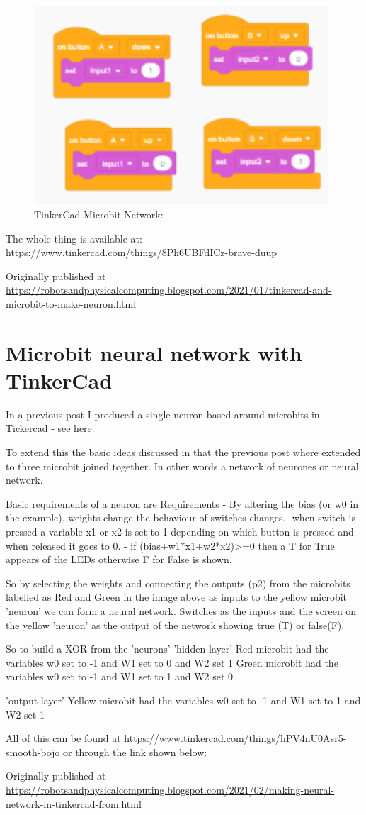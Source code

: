 \begin{figure}
    \centering
    \includegraphics[width=11cm]{chapters/chAi1/figures/Tinkercadann4.png}
    \caption{TinkerCad Microbit Network: }
    \label{fig:tinkercad_neural_microbit_network_basic3}
\end{figure}

The whole thing is available at: \url{https://www.tinkercad.com/things/8Ph6UBFdICz-brave-duup }

Originally published at \url{https://robotsandphysicalcomputing.blogspot.com/2021/01/tinkercad-and-microbit-to-make-neuron.html}


\section{Microbit neural network with TinkerCad}
In a previous post I produced a single neuron based around microbits in Tickercad - see here.

To extend this the basic ideas discussed in that the previous post where extended to three microbit joined together. In  other words a network of neurones or neural network.

Basic requirements of a neuron are
Requirements 
- By altering the bias (or w0 in the example), weights change the behaviour of switches changes.
-when switch is pressed a variable x1 or x2 is set to 1 depending on which button is pressed and when released it goes to 0. 
- if (bias+w1*x1+w2*x2)>=0 then a T for True appears of the LEDs otherwise F for False is shown.

So by selecting the weights and connecting the outputs (p2) from the microbits labelled as Red and Green in the image above as inputs to the yellow microbit 'neuron' we can form a neural network. Switches as the inputs and the screen on the yellow 'neuron' as the output of the network showing true (T) or false(F).

So to build a XOR from the 'neurons'
'hidden layer'
Red microbit had the variables w0 set to -1 and W1 set to 0 and W2 set 1
Green microbit had the variables w0 set to -1 and W1 set to 1 and W2 set 0

'output layer'
Yellow microbit had the variables w0 set to -1 and W1 set to 1 and W2 set 1

All of this can be found at https://www.tinkercad.com/things/hPV4nU0Asr5-smooth-bojo or through the link shown below:

Originally published at \url{https://robotsandphysicalcomputing.blogspot.com/2021/02/making-neural-network-in-tinkercad-from.html}